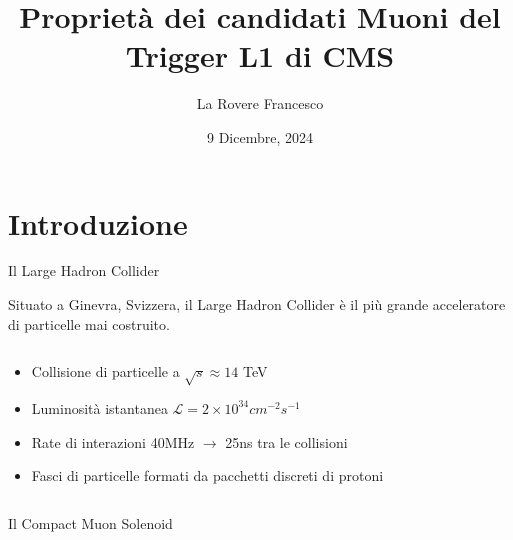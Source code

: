 \documentclass{beamer}
\title{Proprietà dei candidati Muoni del Trigger L1 di CMS}
\author[La Rovere Francesco]{La Rovere Francesco}
\date{9 Dicembre, 2024}
\begin{document}
\footnotesize

\frame{\titlepage}

\section{Introduzione}

\begin{frame}{Il Large Hadron Collider}

Situato a Ginevra, Svizzera, il Large Hadron Collider è il più grande acceleratore di particelle mai costruito. 

\vspace{0.5cm}
\begin{columns}
    \begin{column}{0.65\textwidth}
        \begin{itemize}
            \setlength{\itemsep}{10pt} %
            \item Collisione di particelle a $\sqrt{s} \approx 14$ TeV
            \item Luminosità istantanea $\mathcal{L} = 2 \times 10^{34}cm^{-2}s^{-1}$
            \item Rate di interazioni 40MHz $\rightarrow$ 25ns tra le collisioni
            \item Fasci di particelle formati da pacchetti discreti di protoni
        \end{itemize}
    \end{column}
    \begin{column}{0.35\textwidth}  
    \end{column}
\end{columns}

\end{frame}


\begin{frame}{Il Compact Muon Solenoid}

\begin{columns}
    \begin{column}{0.45\textwidth}
    \end{column}
    \begin{column}{0.55\textwidth}  
    \end{column}
\end{columns}

\end{frame}
\end{document}
